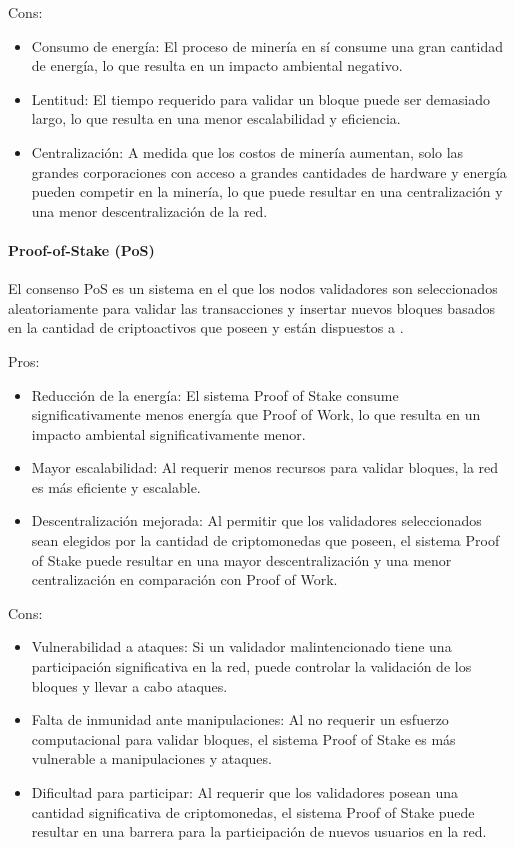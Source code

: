 Cons:
\begin{itemize}

    \item Consumo de energía: El proceso de minería en sí consume una gran cantidad de energía, lo que resulta en un impacto ambiental negativo.

    \item Lentitud: El tiempo requerido para validar un bloque puede ser demasiado largo, lo que resulta en una menor escalabilidad y eficiencia.

    \item Centralización: A medida que los costos de minería aumentan, solo las grandes corporaciones con acceso a grandes cantidades de hardware y energía pueden competir en la minería, lo que puede resultar en una centralización y una menor descentralización de la red.

\end{itemize}

\paragraph{Proof-of-Stake (PoS)} El consenso PoS es un sistema en el que los nodos validadores son seleccionados aleatoriamente para validar las transacciones y insertar nuevos bloques basados en la cantidad de criptoactivos que poseen y están dispuestos a .

\bigskip

Pros:

\begin{itemize}
    \item Reducción de la energía: El sistema Proof of Stake consume significativamente menos energía que Proof of Work, lo que resulta en un impacto ambiental significativamente menor.
    \item Mayor escalabilidad: Al requerir menos recursos para validar bloques, la red es más eficiente y escalable.
    \item Descentralización mejorada: Al permitir que los validadores seleccionados sean elegidos por la cantidad de criptomonedas que poseen, el sistema Proof of Stake puede resultar en una mayor descentralización y una menor centralización en comparación con Proof of Work.
\end{itemize}

Cons:

\begin{itemize}
    \item Vulnerabilidad a ataques: Si un validador malintencionado tiene una participación significativa en la red, puede controlar la validación de los bloques y llevar a cabo ataques.
    \item Falta de inmunidad ante manipulaciones: Al no requerir un esfuerzo computacional para validar bloques, el sistema Proof of Stake es más vulnerable a manipulaciones y ataques.
    \item Dificultad para participar: Al requerir que los validadores posean una cantidad significativa de criptomonedas, el sistema Proof of Stake puede resultar en una barrera para la participación de nuevos usuarios en la red.
\end{itemize}

